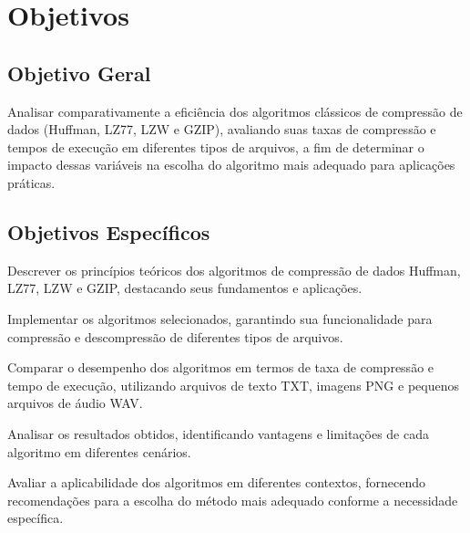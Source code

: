 \chapter{Objetivos}
\label{c.objetivos}

\section{Objetivo Geral}

Analisar comparativamente a eficiência dos algoritmos clássicos de compressão de dados (Huffman, LZ77, LZW e GZIP), avaliando suas taxas de compressão e tempos de execução em diferentes tipos de arquivos, a fim de determinar o impacto dessas variáveis na escolha do algoritmo mais adequado para aplicações práticas.

\section{Objetivos Específicos}

\begin{alineas}
	\item Descrever os princípios teóricos dos algoritmos de compressão de dados Huffman, LZ77, LZW e GZIP, destacando seus fundamentos e aplicações.
	\item Implementar os algoritmos selecionados, garantindo sua funcionalidade para compressão e descompressão de diferentes tipos de arquivos.
	\item Comparar o desempenho dos algoritmos em termos de taxa de compressão e tempo de execução, utilizando arquivos
    de texto TXT, imagens PNG e pequenos arquivos de áudio WAV.
	\item Analisar os resultados obtidos, identificando vantagens e limitações de cada algoritmo em diferentes cenários.
	\item Avaliar a aplicabilidade dos algoritmos em diferentes contextos, fornecendo recomendações para a escolha do método mais adequado conforme a necessidade específica.
\end{alineas}
